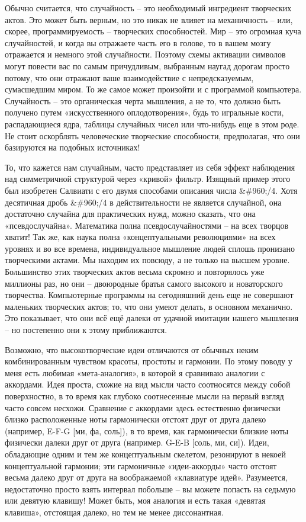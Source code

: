 \documentclass[../main.tex]{subfiles}
\begin{document}
Обычно считается, что случайность \--- это необходимый ингредиент творческих актов. Это может быть верным, но это никак не влияет на механичность \--- или, скорее, программируемость \--- творческих способностей. Мир \--- это огромная куча случайностей, и когда вы отражаете часть его в голове, то в вашем мозгу отражается и немного этой случайности. Поэтому схемы активации символов могут повести вас по самым причудливым, выбранным наугад дорогам просто потому, что они отражают ваше взаимодействие с непредсказуемым, сумасшедшим миром. То же самое может произойти и с программой компьютера. Случайность \--- это органическая черта мышления, а не то, что должно быть получено путем «искусственного оплодотворения», будь то игральные кости, распадающиеся ядра, таблицы случайных чисел или что-нибудь еще в этом роде. Не стоит оскорблять человеческие творческие способности, предполагая, что они базируются на подобных источниках!

То, что кажется нам случайным, часто представляет из себя эффект наблюдения над симметричной структурой через «кривой» фильтр. Изящный пример этого был изобретен Салвиати с его двумя способами описания числа \&\#960;/4. Хотя десятичная дробь \&\#960;/4 в действительности не является случайной, она достаточно случайна для практических нужд, можно сказать, что она «псевдослучайна». Математика полна псевдослучайностями \--- на всех творцов хватит! Так же, как наука полна «концептуальными революциями» на всех уровнях и во все времена, индивидуальное мышление людей сплошь пронизано творческими актами. Мы находим их повсюду, а не только на высшем уровне. Большинство этих творческих актов весьма скромно и повторялось уже миллионы раз, но они \--- двоюродные братья самого высокого и новаторского творчества. Компьютерные программы на сегодняшний день еще не совершают маленьких творческих актов; то, что они умеют делать, в основном механично. Это показывает, что они всё ещё далеки от удачной имитации нашего мышления \--- но постепенно они к этому приближаются.

Возможно, что высокотворческие идеи отличаются от обычных неким комбинированным чувством красоты, простоты и гармонии. По этому поводу у меня есть любимая «мета-аналогия», в которой я сравниваю аналогии с аккордами. Идея проста, схожие на вид мысли часто соотносятся между собой поверхностно, в то время как глубоко соотнесенные мысли на первый взгляд часто совсем несхожи. Сравнение с аккордами здесь естественно физически близко расположенные ноты гармонически отстоят друг от друга далеко (например, E-F-G {[}ми, фа, соль{]}), в то время, как гармонически близкие ноты физически далеки друг от друга (например. G-E-B {[}соль, ми, си{]}). Идеи, обладающие одним и тем же концептуальным скелетом, резонируют в некоей концептуальной гармонии; эти гармоничные «идеи-аккорды» часто отстоят весьма далеко друг от друга на воображаемой «клавиатуре идей». Разумеется, недостаточно просто взять интервал побольше \--- вы можете попасть на седьмую или девятую клавишу! Может быть, моя аналогия и есть такая «девятая клавиша», отстоящая далеко, но тем не менее диссонантная.
\end{document}
